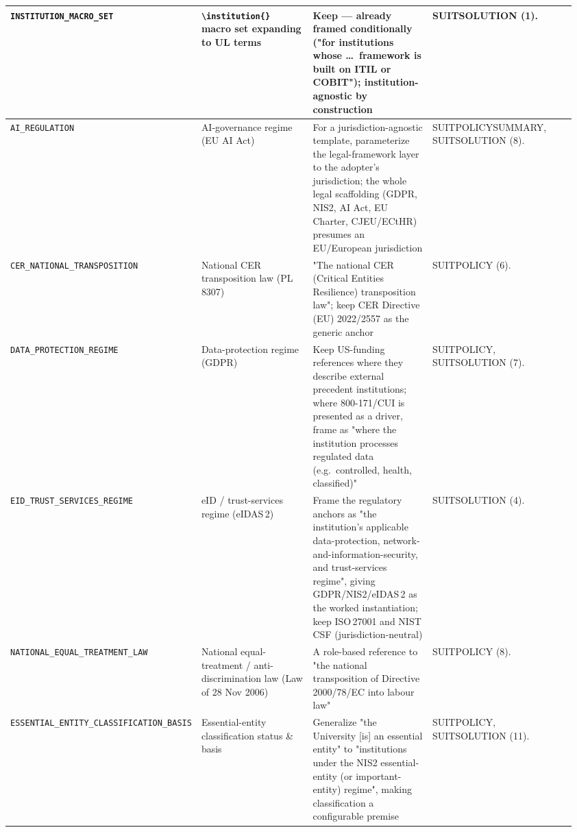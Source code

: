 \begin{center}
\begin{longtable}{@{}p{0.20\linewidth}p{0.24\linewidth}p{0.24\linewidth}p{0.28\linewidth}@{}}
\texttt{INSTITUTION\_MACRO\_SET} &
\texttt{\textbackslash institution\{\}} macro set expanding to UL terms &
Keep --- already framed conditionally ("for institutions whose \dots\ framework is built on ITIL or COBIT"); institution-agnostic by construction &
SUITSOLUTION (1).\\
\midrule

\texttt{AI\_REGULATION} &
AI-governance regime (EU AI Act) &
For a jurisdiction-agnostic template, parameterize the legal-framework layer to the adopter's jurisdiction; the whole legal scaffolding (GDPR, NIS2, AI Act, EU Charter, CJEU/ECtHR) presumes an EU/European jurisdiction &
SUITPOLICYSUMMARY, SUITSOLUTION (8).\\
\midrule

\texttt{CER\_NATIONAL\_TRANSPOSITION} &
National CER transposition law (PL 8307) &
"The national CER (Critical Entities Resilience) transposition law"; keep CER Directive (EU) 2022/2557 as the generic anchor &
SUITPOLICY (6).\\
\midrule

\texttt{DATA\_PROTECTION\_REGIME} &
Data-protection regime (GDPR) &
Keep US-funding references where they describe external precedent institutions; where 800-171/CUI is presented as a driver, frame as "where the institution processes regulated data (e.g.\ controlled, health, classified)" &
SUITPOLICY, SUITSOLUTION (7).\\
\midrule

\texttt{EID\_TRUST\_SERVICES\_REGIME} &
eID / trust-services regime (eIDAS\,2) &
Frame the regulatory anchors as "the institution's applicable data-protection, network-and-information-security, and trust-services regime", giving GDPR/NIS2/eIDAS\,2 as the worked instantiation; keep ISO\,27001 and NIST CSF (jurisdiction-neutral) &
SUITSOLUTION (4).\\
\midrule

\texttt{NATIONAL\_EQUAL\_TREATMENT\_LAW} &
National equal-treatment / anti-discrimination law (Law of 28 Nov 2006) &
A role-based reference to "the national transposition of Directive 2000/78/EC into labour law" &
SUITPOLICY (8).\\
\midrule

\texttt{ESSENTIAL\_ENTITY\_CLASSIFICATION\_BASIS} &
Essential-entity classification status \& basis &
Generalize "the University [is] an essential entity" to "institutions under the NIS2 essential-entity (or important-entity) regime", making classification a configurable premise &
SUITPOLICY, SUITSOLUTION (11).\\
\midrule


\end{longtable}
\end{center}
